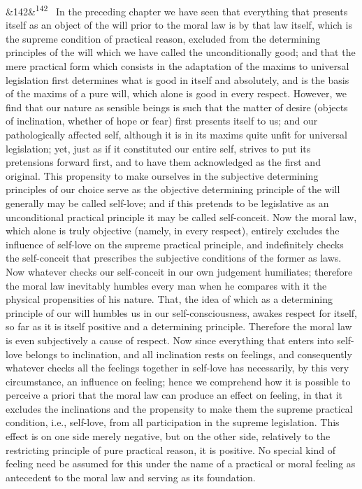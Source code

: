 \documentclass[12pt]{article}
\newcommand{\para}[1][]{\par\noindent\ifx&#1&\else\textsuperscript{\footnotesize #1}~\fi}
\begin{document}
\para[142] In the preceding chapter we have seen that everything that presents itself as an object of the will prior to the moral law is by that law itself, which is the supreme condition of practical reason, excluded from the determining principles of the will which we have called the unconditionally good; and that the mere practical form which consists in the adaptation of the maxims to universal legislation first determines what is good in itself and absolutely, and is the basis of the maxims of a pure will, which alone is good in every respect. However, we find that our nature as sensible beings is such that the matter of desire (objects of inclination, whether of hope or fear) first presents itself to us; and our pathologically affected self, although it is in its maxims quite unfit for universal legislation; yet, just as if it constituted our entire self, strives to put its pretensions forward first, and to have them acknowledged as the first and original. This propensity to make ourselves in the subjective determining principles of our choice serve as the objective determining principle of the will generally may be called self-love; and if this pretends to be legislative as an unconditional practical principle it may be called self-conceit. Now the moral law, which alone is truly objective (namely, in every respect), entirely excludes the influence of self-love on the supreme practical principle, and indefinitely checks the self-conceit that prescribes the subjective conditions of the former as laws. Now whatever checks our self-conceit in our own judgement humiliates; therefore the moral law inevitably humbles every man when he compares with it the physical propensities of his nature. That, the idea of which as a determining principle of our will humbles us in our self-consciousness, awakes respect for itself, so far as it is itself positive and a determining principle. Therefore the moral law is even subjectively a cause of respect. Now since everything that enters into self-love belongs to inclination, and all inclination rests on feelings, and consequently whatever checks all the feelings together in self-love has necessarily, by this very circumstance, an influence on feeling; hence we comprehend how it is possible to perceive a priori that the moral law can produce an effect on feeling, in that it excludes the inclinations and the propensity to make them the supreme practical condition, i.e., self-love, from all participation in the supreme legislation. This effect is on one side merely negative, but on the other side, relatively to the restricting principle of pure practical reason, it is positive. No special kind of feeling need be assumed for this under the name of a practical or moral feeling as antecedent to the moral law and serving as its foundation.
\end{document}
